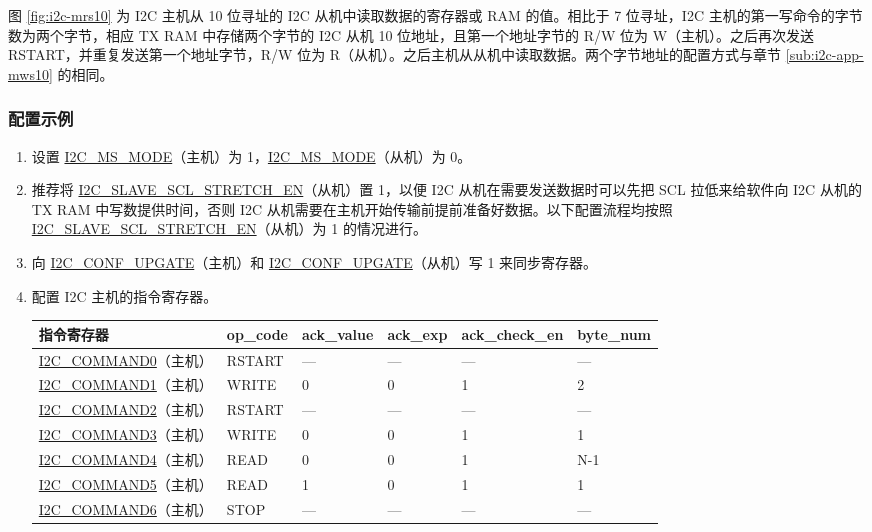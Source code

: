 \documentclass[main\_\_CN.tex]{subfiles}
\begin{document}
图 \ref{fig:i2c-mrs10} 为 I2C 主机从 10 位寻址的 I2C 从机中读取数据的寄存器或 RAM 的值。相比于 7 位寻址，I2C 主机的第一写命令的字节数为两个字节，相应 TX RAM 中存储两个字节的 I2C 从机 10 位地址，且第一个地址字节的 R/W 位为 W（主机）。之后再次发送 RSTART，并重复发送第一个地址字节，R/W 位为 R（从机）。之后主机从从机中读取数据。两个字节地址的配置方式与章节 \ref{sub:i2c-app-mws10} 的相同。

\subsubsection{配置示例}

\begin{enumerate}
\item 设置 \hyperref[fielddesc:I2CMSMODE]{I2C\_MS\_MODE}（主机）为 1，\hyperref[fielddesc:I2CMSMODE]{I2C\_MS\_MODE}（从机）为 0。
\item 推荐将 \hyperref[fielddesc:I2CSLAVESCLSTRETCHEN]{I2C\_SLAVE\_SCL\_STRETCH\_EN}（从机）置 1，以便 I2C 从机在需要发送数据时可以先把 SCL 拉低来给软件向 I2C 从机的 TX RAM 中写数提供时间，否则 I2C 从机需要在主机开始传输前提前准备好数据。以下配置流程均按照 \hyperref[fielddesc:I2CSLAVESCLSTRETCHEN]{I2C\_SLAVE\_SCL\_STRETCH\_EN}（从机）为 1 的情况进行。
\item 向 \hyperref[fielddesc:I2CCONFUPGATE]{I2C\_CONF\_UPGATE}（主机）和 \hyperref[fielddesc:I2CCONFUPGATE]{I2C\_CONF\_UPGATE}（从机）写 1 来同步寄存器。
\item 配置 I2C 主机的指令寄存器。

\begin{longtable}{ | p{4cm} | p{2cm} | p{2cm} | p{2cm} |p{2cm} | p{2cm} |}
\hline\rowcolor{lightgray}
指令寄存器& op\_code & ack\_value&ack\_exp&ack\_check\_en&byte\_num  \\ \hline
\hyperref[fielddesc:I2CCOMMAND0]{I2C\_COMMAND0}（主机）& RSTART& ---&---&---&---  \\ \hline
\hyperref[fielddesc:I2CCOMMAND1]{I2C\_COMMAND1}（主机）& WRITE& 0&0&1&2  \\ \hline
\hyperref[fielddesc:I2CCOMMAND2]{I2C\_COMMAND2}（主机）& RSTART& ---&---&---&---  \\ \hline
\hyperref[fielddesc:I2CCOMMAND3]{I2C\_COMMAND3}（主机）& WRITE& 0&0&1&1  \\ \hline
\hyperref[fielddesc:I2CCOMMAND4]{I2C\_COMMAND4}（主机）& READ& 0&0&1&N-1  \\ \hline
\hyperref[fielddesc:I2CCOMMAND5]{I2C\_COMMAND5}（主机）& READ& 1&0&1&1  \\ \hline
\hyperref[fielddesc:I2CCOMMAND6]{I2C\_COMMAND6}（主机）& STOP& ---&---&---&---  \\ \hline
\end{longtable}


\end{enumerate}
\end{document}
